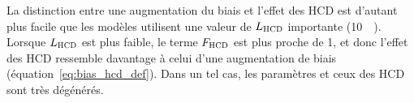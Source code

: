   La distinction entre une augmentation du biais et l'effet des HCD est d'autant plus facile que les modèles utilisent une valeur de $L_{\textsc{HCD}}$ importante (\SI{10}{\perh\Mpc}). Lorsque $L_{\textsc{HCD}}$ est plus faible, le terme $F_{\textsc{HCD}}$ est plus proche de 1, et donc l'effet des HCD ressemble davantage à celui d'une augmentation de biais (équation~\ref{eq:bias_hcd_def}). Dans un tel cas, les paramètres \lya{} et ceux des HCD sont très dégénérés.

